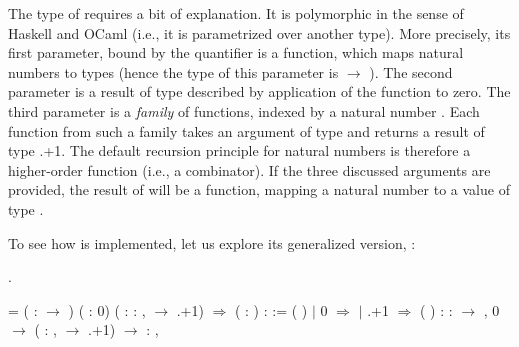 \coqdocemptyline


The type of  requires a bit of explanation. It is
polymorphic in the sense of Haskell and OCaml (i.e., it is
parametrized over another type). More precisely, its first parameter,
bound by the \coqdockw{\ensuremath{\forall}} quantifier is a function, which maps natural
numbers to types (hence the type of this parameter is  \ensuremath{\rightarrow}
). The second parameter is a result of type described by
application of the function  to zero. The third parameter is a
\textit{family} of functions, indexed by a natural number . Each function
from such a family takes an argument of type   and returns a
result of type  .+1. The default recursion
principle for natural numbers is
therefore a higher-order function (i.e., a combinator). If the three
 discussed arguments are provided, the result of
 will be a function, mapping a natural number  to a value
of type  .


To see how  is implemented, let us explore its generalized
version, :


\begin{coqdoccode}
\coqdocemptyline
\coqdocnoindent
{} .\coqdoceol
\end{coqdoccode}


\coqdoceol
\coqdocemptyline
\coqdocnoindent
{} = \coqdoceol
\coqdocindent{0.50em}
 ( :  \ensuremath{\rightarrow} ) ( :  0) ( : \coqdockw{\ensuremath{\forall}}  : ,   \ensuremath{\rightarrow}  .+1) \ensuremath{\Rightarrow}\coqdoceol
\coqdocindent{0.50em}
  ( : ) :   :=\coqdoceol
\coqdocindent{1.50em}
     ( ) \coqdoceol
\coqdocindent{1.50em}
\ensuremath{|} 0 \ensuremath{\Rightarrow} \coqdoceol
\coqdocindent{1.50em}
\ensuremath{|} .+1 \ensuremath{\Rightarrow}   ( )\coqdoceol
\coqdocindent{1.50em}
\coqdoceol
\coqdocindent{3.00em}
: \coqdockw{\ensuremath{\forall}}  :  \ensuremath{\rightarrow} ,\coqdoceol
\coqdocindent{4.00em}
 0 \ensuremath{\rightarrow} (\coqdockw{\ensuremath{\forall}}  : ,   \ensuremath{\rightarrow}  .+1) \ensuremath{\rightarrow} \coqdockw{\ensuremath{\forall}}  : ,  

